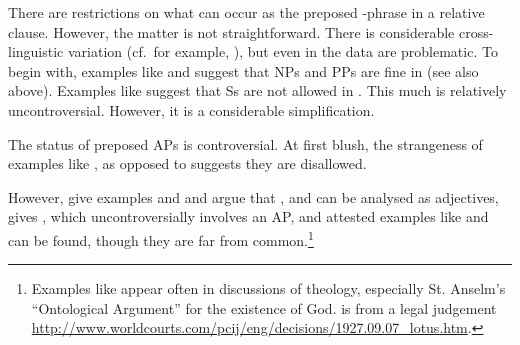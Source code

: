 \documentclass[output=paper
 	        ,biblatex
                ,babelshorthands
                ,newtxmath
                ,draftmode
                ,colorlinks, citecolor=brown
]{langscibook}
\begin{document}
There are restrictions on what can occur as the preposed -phrase in a relative
clause. However, the matter is not straightforward. There is considerable cross-linguistic
variation (cf.\ for example, \citealt{Webelhuth92a-u}), but even in  the data are
problematic. To begin with, examples like  and  suggest that NPs and PPs
are fine in  (see also  above). Examples like 
suggest that Ss are not allowed in . This much is relatively
uncontroversial. However, it is a considerable simplification.
\begin{exe}\ex\begin{xlist}\label{x:rc-23}
 \label{x:rc-24}
 \label{x:rc-25}
 \label{x:rc-28}
\end{xlist}\end{exe}
The status of preposed APs is controversial. At first blush, the
strangeness of examples like , as opposed to  suggests
they are disallowed.
\begin{exe}
  \ex\begin{xlist}
    \label{x:rc-240}
    \label{x:rc-241}
  \end{xlist}
\end{exe}
However, \cite[311]{NanniStillings78} give examples  and 
and argue that , and  can be analysed as adjectives,
\cite[129]{Webelhuth92a-u} gives , which uncontroversially involves an AP,
and attested examples like  and  can be found, though they
are far from common.\footnote{Examples like  appear often in discussions of
  theology, especially St. Anselm's ``Ontological Argument'' for the existence of
  God.  is from a legal judgement
  \url{http://www.worldcourts.com/pcij/eng/decisions/1927.09.07_lotus.htm}.}
\begin{exe}\ex\begin{xlist}\label{x:rc-230}
    \label{x:rc-231}
    \label{x:rc-232}
    \label{x:rc-233}
     \label{x:rc-234}
    \label{x:rc-235} 
  \end{xlist}\end{exe}
\end{document}
